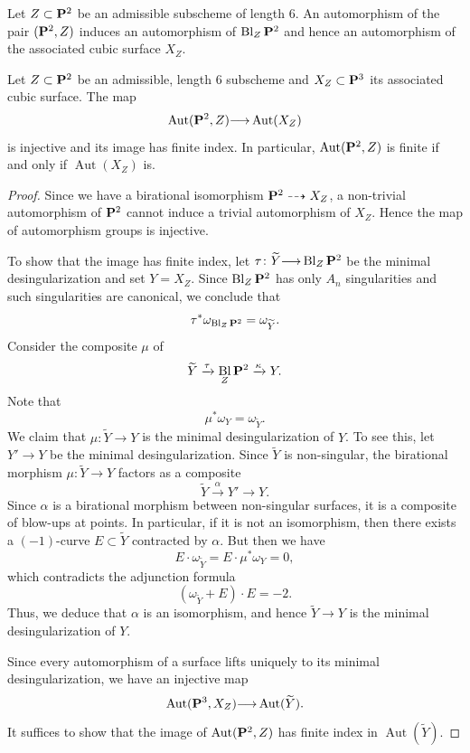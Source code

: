 \documentclass[reqno]{amsart}
\DeclareMathOperator{\Bl}{Bl}
\renewcommand{\to}{{\longrightarrow}}
\renewcommand {\P}{{\bf P}}
\providecommand{\Aut}{\operatorname{Aut}}
\numberwithin{equation}{section}
\begin{document}
Let $Z \subset \P^2$ be an admissible subscheme of length 6.
An automorphism of the pair $(\P^2, Z)$ induces an automorphism of $\Bl_Z\P^2$ and hence an automorphism of the associated cubic surface $X_Z$.

\begin{proposition}
  \label{prop:good} Let $Z \subset \P^2$ be an admissible, length $6$
  subscheme and $X_Z \subset \P^3$ its associated cubic surface.
  The map
  \[ \Aut(\P^2, Z) \to \Aut(X_Z)\]
  is injective and its image has finite index.
  In particular, $\Aut(\P^2, Z)$ is finite if and only if $\Aut(X_Z)$ is.
\end{proposition}

\begin{proof}
  Since we have a birational isomorphism $\P^2 \dashrightarrow X_Z$, a non-trivial automorphism of $\P^2$ cannot induce a trivial automorphism of $X_Z$.
  Hence the map of automorphism groups is injective.

  To show that the image has finite index, let $\tau \colon \widetilde Y \to \Bl_Z\P^2$ be the minimal desingularization and set $Y = X_Z$.
  Since $\Bl_Z\P^2$ has only $A_n$ singularities and such singularities are canonical, we conclude that
  \[\tau^* \omega_{\Bl_Z\P^2} = \omega_{\widetilde Y}.\]
  Consider the composite $\mu$ of
  \[ \widetilde Y \xrightarrow{\tau} \Bl_Z \P^2 \xrightarrow{\kappa} Y.\]
  Note that
  \[ \mu^* \omega_Y = \omega_{\widetilde Y}.\]
  We claim that $\mu \colon \widetilde Y \to Y$ is the minimal desingularization of $Y$.
  To see this, let $Y' \to Y$ be the minimal desingularization.
  Since $\widetilde Y$ is non-singular, the birational morphism $\mu \colon \widetilde Y \to Y$ factors as a composite
  \[ \widetilde Y \xrightarrow{\alpha} Y' \to Y.\]
  Since $\alpha$ is a birational morphism between non-singular surfaces, it is a composite of blow-ups at points.
  In particular, if it is not an isomorphism, then there exists a $(-1)$-curve $E \subset \widetilde Y$ contracted by $\alpha$.
  But then we have
  \[ E \cdot \omega_{\widetilde Y} = E \cdot \mu^* \omega_Y = 0,\]
  which contradicts the adjunction formula
  \[ \left(\omega_{\widetilde Y}+ E\right) \cdot E = -2.\]
  Thus, we deduce that $\alpha$ is an isomorphism, and hence $\widetilde Y \to Y$ is the minimal desingularization of $Y$.

  Since every automorphism of a surface lifts uniquely to its minimal
  desingularization, we have an injective map
  \[ \Aut(\P^3, X_Z) \to \Aut(\widetilde Y).\]
  It suffices to show that the image of $\Aut(\P^2, Z)$ has finite index in $\Aut(\widetilde Y)$.


\end{proof}
\end{document}
